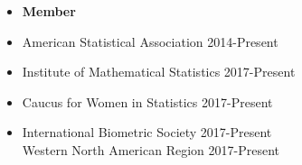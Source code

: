 \documentclass[11pt]{article}
\makeatletter
\newcommand\regsz{\@setfontsize\regsz{12pt}{6}}
\newcommand{\tab}{\hspace*{2em}}
\makeatother
\begin{document}
\begin{itemize}
	\item[] \textbf{Member} \vspace{-4mm}
	\item[] American Statistical Association \hfill 2014-Present \vspace{-4mm}
	\item[] Institute of Mathematical Statistics \hfill 2017-Present \vspace{-4mm}
	\item[] Caucus for Women in Statistics \hfill 2017-Present \vspace{-4mm}
	\item[] International Biometric Society \hfill 2017-Present \vspace{-1mm}\\
	\tab Western North American Region \hfill 2017-Present  \vspace{-4mm}
\end{itemize}

%
\end{document}
